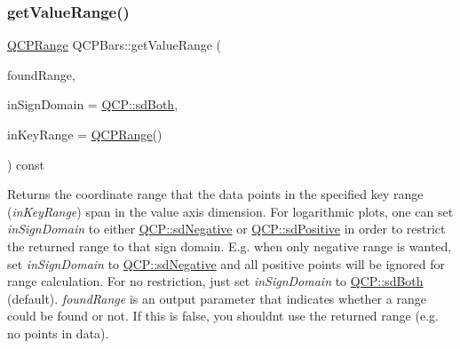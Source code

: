 \mbox{\label{class_q_c_p_bars_a02cee4bf94d48a1e5f6fc185d9a10477}} 
\subsubsection{\texorpdfstring{getValueRange()}{getValueRange()}}
{\footnotesize\ttfamily \mbox{\hyperlink{class_q_c_p_range}{Q\+C\+P\+Range}} Q\+C\+P\+Bars\+::get\+Value\+Range (\begin{DoxyParamCaption}\item[{bool \&}]{found\+Range,  }\item[{\mbox{\hyperlink{namespace_q_c_p_afd50e7cf431af385614987d8553ff8a9}{Q\+C\+P\+::\+Sign\+Domain}}}]{in\+Sign\+Domain = {\ttfamily \mbox{\hyperlink{namespace_q_c_p_afd50e7cf431af385614987d8553ff8a9aa38352ef02d51ddfa4399d9551566e24}{Q\+C\+P\+::sd\+Both}}},  }\item[{const \mbox{\hyperlink{class_q_c_p_range}{Q\+C\+P\+Range}} \&}]{in\+Key\+Range = {\ttfamily \mbox{\hyperlink{class_q_c_p_range}{Q\+C\+P\+Range}}()} }\end{DoxyParamCaption}) const\hspace{0.3cm}{\ttfamily [virtual]}}

Returns the coordinate range that the data points in the specified key range ({\itshape in\+Key\+Range}) span in the value axis dimension. For logarithmic plots, one can set {\itshape in\+Sign\+Domain} to either \mbox{\hyperlink{namespace_q_c_p_afd50e7cf431af385614987d8553ff8a9a2d18af0bc58f6528d1e82ce699fe4829}{Q\+C\+P\+::sd\+Negative}} or \mbox{\hyperlink{namespace_q_c_p_afd50e7cf431af385614987d8553ff8a9a584784b75fb816abcc627cf743bb699f}{Q\+C\+P\+::sd\+Positive}} in order to restrict the returned range to that sign domain. E.\+g. when only negative range is wanted, set {\itshape in\+Sign\+Domain} to \mbox{\hyperlink{namespace_q_c_p_afd50e7cf431af385614987d8553ff8a9a2d18af0bc58f6528d1e82ce699fe4829}{Q\+C\+P\+::sd\+Negative}} and all positive points will be ignored for range calculation. For no restriction, just set {\itshape in\+Sign\+Domain} to \mbox{\hyperlink{namespace_q_c_p_afd50e7cf431af385614987d8553ff8a9aa38352ef02d51ddfa4399d9551566e24}{Q\+C\+P\+::sd\+Both}} (default). {\itshape found\+Range} is an output parameter that indicates whether a range could be found or not. If this is false, you shouldn\textquotesingle{}t use the returned range (e.\+g. no points in data).

